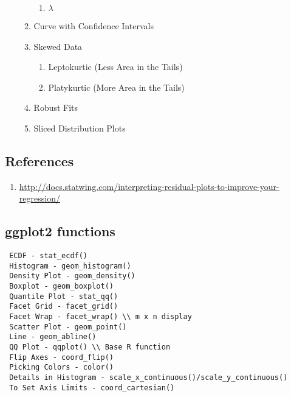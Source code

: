 \documentclass[11pt]{article}
\begin{document}
\begin{enumerate}
\begin{enumerate}
\begin{enumerate}
			\item $\lambda$
		\end{enumerate}
	    \item Curve with Confidence Intervals
	     \item Skewed Data
	     \begin{enumerate}
	       \item Leptokurtic (Less Area in the Tails)
	     \item Platykurtic (More Area in the Tails)
	     \end{enumerate}
        \item Robust Fits
        \item Sliced Distribution Plots
	\end{enumerate}
	\end{enumerate}
\newpage
\subsection*{References}
\begin{enumerate}
	\item \url{http://docs.statwing.com/interpreting-residual-plots-to-improve-your-regression/}
\end{enumerate}
\subsection*{ggplot2 functions}
\begin{verbatim}
 ECDF - stat_ecdf()
 Histogram - geom_histogram()
 Density Plot - geom_density()
 Boxplot - geom_boxplot()
 Quantile Plot - stat_qq()
 Facet Grid - facet_grid()
 Facet Wrap - facet_wrap() \\ m x n display
 Scatter Plot - geom_point()
 Line - geom_abline()
 QQ Plot - qqplot() \\ Base R function
 Flip Axes - coord_flip()
 Picking Colors - color()
 Details in Histogram - scale_x_continuous()/scale_y_continuous()
 To Set Axis Limits - coord_cartesian()
\end{verbatim}
\end{document}
